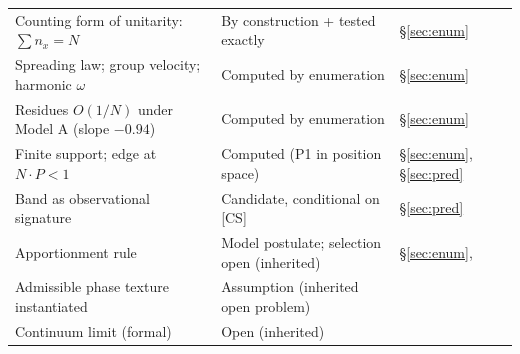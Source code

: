 \documentclass[11pt]{article}
\theoremstyle{definition}
\theoremstyle{remark}
\begin{document}
\begin{center}
\begin{tabular}{@{}lll@{}}
Counting form of unitarity: $\sum n_x = N$ & By construction + tested exactly & \S\ref{sec:enum}\\
Spreading law; group velocity; harmonic $\omega$ & Computed by enumeration & \S\ref{sec:enum}\\
Residues $O(1/N)$ under Model A (slope $-0.94$) & Computed by enumeration & \S\ref{sec:enum}\\
Finite support; edge at $N\!\cdot\!P < 1$ & Computed (P1 in position space) & \S\ref{sec:enum}, \S\ref{sec:pred}\\
Band as observational signature & Candidate, conditional on [CS] & \S\ref{sec:pred}\\
Apportionment rule & Model postulate; selection open (inherited) & \S\ref{sec:enum}, \cite{TillittCHSH}\\
Admissible phase texture instantiated & Assumption (inherited open problem) & \cite{TillittBorn}\\
Continuum limit (formal) & Open (inherited) & \cite{TillittCR}\\
\bottomrule
\end{tabular}
\end{center}
\end{document}
